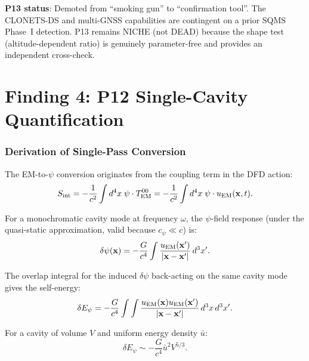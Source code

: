 \documentclass[11pt]{article}
\begin{document}
\textbf{P13 status}: Demoted from ``smoking gun'' to ``confirmation tool''.
The CLONETS-DS and multi-GNSS capabilities are contingent on a prior SQMS
Phase~I detection. P13 remains NICHE (not DEAD) because the shape test
(altitude-dependent ratio) is genuinely parameter-free and provides an
independent cross-check.


\part{Finding 4: P12 Single-Cavity Quantification}
\label{part:P12-single}

\section{Derivation of Single-Pass Conversion}

The EM-to-$\psi$ conversion originates from the coupling term in the
DFD action:
\begin{equation}
S_{\rm int} = -\frac{1}{c^2}\int d^4x\;\psi \cdot T_{\rm EM}^{00}
= -\frac{1}{c^2}\int d^4x\;\psi \cdot u_{\rm EM}(\mathbf{x},t).
\end{equation}

For a monochromatic cavity mode at frequency $\omega$, the $\psi$-field
response (under the quasi-static approximation, valid because
$c_\psi \ll c$) is:
\begin{equation}
\delta\psi(\mathbf{x}) = -\frac{G}{c^4}\int \frac{u_{\rm EM}(\mathbf{x}')}{
|\mathbf{x}-\mathbf{x}'|}\,d^3x'.
\end{equation}

The overlap integral for the induced $\delta\psi$ back-acting on the
same cavity mode gives the self-energy:
\begin{equation}
\delta E_\psi = -\frac{G}{c^4}\int\int
\frac{u_{\rm EM}(\mathbf{x})u_{\rm EM}(\mathbf{x}')}{|\mathbf{x}-\mathbf{x}'|}
\,d^3x\,d^3x'.
\end{equation}

For a cavity of volume $V$ and uniform energy density $\bar{u}$:
\begin{equation}
\delta E_\psi \sim -\frac{G}{c^4}\bar{u}^2 V^{5/3}.
\end{equation}
\end{document}
